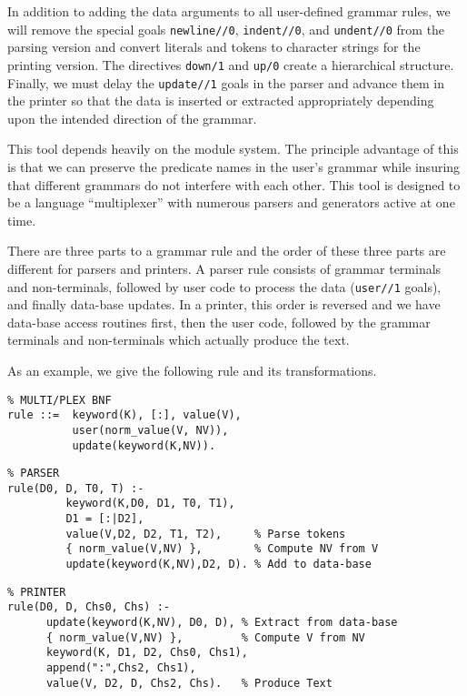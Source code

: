 In addition to adding the data arguments to all user-defined
grammar rules, we will remove the special goals {\tt newline//0},
{\tt indent//0}, and {\tt undent//0} from the parsing version and
convert literals and tokens to character strings for the printing
version. 
The directives {\tt down/1} and {\tt up/0}
create a hierarchical structure. Finally, we must delay
the {\tt update//1} goals in the parser and advance
them in the printer so that the data is inserted or
extracted appropriately depending upon the intended
direction of the grammar.

This tool depends heavily on the module system. The
principle advantage of this is that we can preserve the
predicate names in the user's grammar while insuring that
different grammars do not interfere with each other.
This tool is designed to be a language ``multiplexer''
with numerous parsers and generators active at one time.

There are three parts to a grammar rule and the order
of these three parts are different for parsers and printers.
A parser rule consists of grammar terminals and non-terminals,
followed by user code to process the data ({\tt user//1} goals),
and finally data-base updates.
In a printer, this order is reversed and we have data-base
access routines first, then the user code, followed by
the grammar terminals and non-terminals which actually
produce the text.

As an example, we give the following rule
and its transformations.
\begin{verbatim}
% MULTI/PLEX BNF
rule ::=  keyword(K), [:], value(V),
          user(norm_value(V, NV)),
          update(keyword(K,NV)).
\end{verbatim}

\begin{verbatim}
% PARSER
rule(D0, D, T0, T) :-
         keyword(K,D0, D1, T0, T1),
         D1 = [:|D2],
         value(V,D2, D2, T1, T2),     % Parse tokens
         { norm_value(V,NV) },        % Compute NV from V
         update(keyword(K,NV),D2, D). % Add to data-base
\end{verbatim}

\begin{verbatim}
% PRINTER
rule(D0, D, Chs0, Chs) :- 
      update(keyword(K,NV), D0, D), % Extract from data-base
      { norm_value(V,NV) },         % Compute V from NV
      keyword(K, D1, D2, Chs0, Chs1),
      append(":",Chs2, Chs1), 
      value(V, D2, D, Chs2, Chs).   % Produce Text
\end{verbatim}

